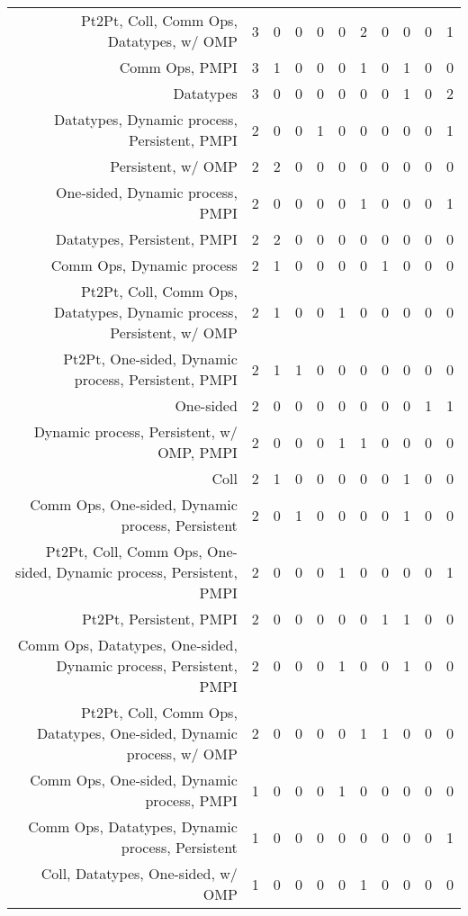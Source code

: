 {\begin{landscape}
\begin{longtable}[htb]{r|c|c|c|c|c|c|c|c|c|c}
{Pt2Pt, Coll, Comm Ops, Datatypes, w/ OMP} & 3 & 0 & 0 & 0 & 0 & 2 & 0 & 0 & 0 & 1 \\%
{Comm Ops, PMPI} & 3 & 1 & 0 & 0 & 0 & 1 & 0 & 1 & 0 & 0 \\%
{Datatypes} & 3 & 0 & 0 & 0 & 0 & 0 & 0 & 1 & 0 & 2 \\%
{Datatypes, Dynamic process, Persistent, PMPI} & 2 & 0 & 0 & 1 & 0 & 0 & 0 & 0 & 0 & 1 \\%
{Persistent, w/ OMP} & 2 & 2 & 0 & 0 & 0 & 0 & 0 & 0 & 0 & 0 \\%
{One-sided, Dynamic process, PMPI} & 2 & 0 & 0 & 0 & 0 & 1 & 0 & 0 & 0 & 1 \\%
{Datatypes, Persistent, PMPI} & 2 & 2 & 0 & 0 & 0 & 0 & 0 & 0 & 0 & 0 \\%
{Comm Ops, Dynamic process} & 2 & 1 & 0 & 0 & 0 & 0 & 1 & 0 & 0 & 0 \\%
{Pt2Pt, Coll, Comm Ops, Datatypes, Dynamic process, Persistent, w/ OMP} & 2 & 1 & 0 & 0 & 1 & 0 & 0 & 0 & 0 & 0 \\%
{Pt2Pt, One-sided, Dynamic process, Persistent, PMPI} & 2 & 1 & 1 & 0 & 0 & 0 & 0 & 0 & 0 & 0 \\%
{One-sided} & 2 & 0 & 0 & 0 & 0 & 0 & 0 & 0 & 1 & 1 \\%
{Dynamic process, Persistent, w/ OMP, PMPI} & 2 & 0 & 0 & 0 & 1 & 1 & 0 & 0 & 0 & 0 \\%
{Coll} & 2 & 1 & 0 & 0 & 0 & 0 & 0 & 1 & 0 & 0 \\%
{Comm Ops, One-sided, Dynamic process, Persistent} & 2 & 0 & 1 & 0 & 0 & 0 & 0 & 1 & 0 & 0 \\%
{Pt2Pt, Coll, Comm Ops, One-sided, Dynamic process, Persistent, PMPI} & 2 & 0 & 0 & 0 & 1 & 0 & 0 & 0 & 0 & 1 \\%
{Pt2Pt, Persistent, PMPI} & 2 & 0 & 0 & 0 & 0 & 0 & 1 & 1 & 0 & 0 \\%
{Comm Ops, Datatypes, One-sided, Dynamic process, Persistent, PMPI} & 2 & 0 & 0 & 0 & 1 & 0 & 0 & 1 & 0 & 0 \\%
{Pt2Pt, Coll, Comm Ops, Datatypes, One-sided, Dynamic process, w/ OMP} & 2 & 0 & 0 & 0 & 0 & 1 & 1 & 0 & 0 & 0 \\%
{Comm Ops, One-sided, Dynamic process, PMPI} & 1 & 0 & 0 & 0 & 1 & 0 & 0 & 0 & 0 & 0 \\%
{Comm Ops, Datatypes, Dynamic process, Persistent} & 1 & 0 & 0 & 0 & 0 & 0 & 0 & 0 & 0 & 1 \\%
{Coll, Datatypes, One-sided, w/ OMP} & 1 & 0 & 0 & 0 & 0 & 1 & 0 & 0 & 0 & 0 \\%

\end{longtable}
\end{landscape}}
